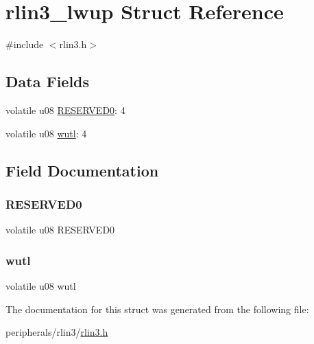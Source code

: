 \hypertarget{structrlin3__lwup}{}\section{rlin3\+\_\+lwup Struct Reference}
\label{structrlin3__lwup}


{\ttfamily \#include $<$rlin3.\+h$>$}

\subsection*{Data Fields}
\begin{DoxyCompactItemize}
\item 
volatile u08 \mbox{\hyperlink{structrlin3__lwup_a59c0b30ccfb89f1b34e9682741859abd}{R\+E\+S\+E\+R\+V\+E\+D0}}\+: 4
\item 
volatile u08 \mbox{\hyperlink{structrlin3__lwup_af3ec8e69944400b555ff79aa36d64cc3}{wutl}}\+: 4
\end{DoxyCompactItemize}


\subsection{Field Documentation}
\mbox{\label{structrlin3__lwup_a59c0b30ccfb89f1b34e9682741859abd}} 
\subsubsection{\texorpdfstring{R\+E\+S\+E\+R\+V\+E\+D0}{RESERVED0}}
{\footnotesize\ttfamily volatile u08 R\+E\+S\+E\+R\+V\+E\+D0}

\mbox{\label{structrlin3__lwup_af3ec8e69944400b555ff79aa36d64cc3}} 
\subsubsection{\texorpdfstring{wutl}{wutl}}
{\footnotesize\ttfamily volatile u08 wutl}



The documentation for this struct was generated from the following file\+:\begin{DoxyCompactItemize}
\item 
peripherals/rlin3/\mbox{\hyperlink{rlin3_8h}{rlin3.\+h}}\end{DoxyCompactItemize}
